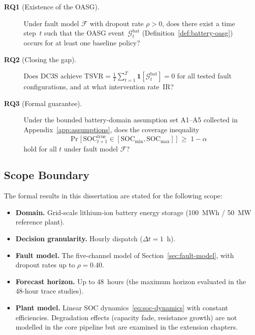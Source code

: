 \begin{description}
  \item[\textbf{RQ1} (Existence of the OASG).]
    Under fault model $\mathcal{F}$ with dropout rate $\rho > 0$, does
    there exist a time step~$t$ such that the OASG
    event~$\mathcal{G}_t^{\mathrm{bat}}$ (Definition~\ref{def:battery-oasg})
    occurs for at least one baseline policy?
  \item[\textbf{RQ2} (Closing the gap).]
    Does DC3S achieve
    $\mathrm{TSVR} = \frac{1}{T}\sum_{t=1}^T
    \mathbf{1}[\mathcal{G}_t^{\mathrm{bat}}] = 0$
    for all tested fault configurations, and at what intervention
    rate~$\mathrm{IR}$?
  \item[\textbf{RQ3} (Formal guarantee).]
    Under the bounded battery-domain assumption set A1--A5 collected in
    Appendix~\ref{app:assumptions}, does the coverage
    inequality
    \[
      \Pr\!\bigl[\,\mathrm{SOC}_{t+1}^{\mathrm{true}}
      \in [\mathrm{SOC}_{\min}, \mathrm{SOC}_{\max}]\,\bigr]
      \;\ge\; 1 - \alpha
    \]
    hold for all $t$ under fault model $\mathcal{F}$?
\end{description}

\subsection{Scope Boundary}
\label{sec:scope}

The formal results in this dissertation are stated for the following
scope:

\begin{itemize}
  \item \textbf{Domain.}  Grid-scale lithium-ion battery energy storage
    (100~MWh / 50~MW reference plant).
  \item \textbf{Decision granularity.}  Hourly dispatch ($\Delta t = 1$~h).
  \item \textbf{Fault model.}  The five-channel model of
    Section~\ref{sec:fault-model}, with dropout rates up to $\rho = 0.40$.
  \item \textbf{Forecast horizon.}  Up to 48~hours (the maximum horizon
    evaluated in the 48-hour trace studies).
  \item \textbf{Plant model.}  Linear SOC dynamics~\eqref{eq:soc-dynamics}
    with constant efficiencies.  Degradation effects (capacity fade,
    resistance growth) are not modelled in the core pipeline but are
    examined in the extension chapters.
\end{itemize}

